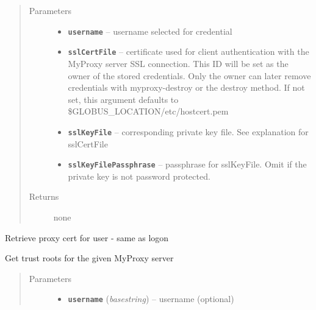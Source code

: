 \documentclass[letterpaper,10pt,english]{sphinxmanual}
\begin{document}
\begin{fulllineitems}
\begin{fulllineitems}
\begin{quote}
\begin{description}
\item[{Parameters}] \leavevmode\begin{itemize}
\item {} 
\textbf{\texttt{username}} -- username selected for credential

\item {} 
\textbf{\texttt{sslCertFile}} -- certificate used for client authentication with the MyProxy server SSL connection.  This ID will be set as the owner of the stored credentials.  Only the owner can later remove credentials with myproxy-destroy or the destroy method.  If not set, this argument defaults to \$GLOBUS\_LOCATION/etc/hostcert.pem

\item {} 
\textbf{\texttt{sslKeyFile}} -- corresponding private key file.  See explanation for sslCertFile

\item {} 
\textbf{\texttt{sslKeyFilePassphrase}} -- passphrase for sslKeyFile.  Omit if the private key is not password protected.

\end{itemize}

\item[{Returns}] \leavevmode
none

\end{description}\end{quote}

\end{fulllineitems}


\begin{fulllineitems}
\label{client:myproxy.client.MyProxyClient.getDelegation}
Retrieve proxy cert for user - same as logon

\end{fulllineitems}


\begin{fulllineitems}
\label{client:myproxy.client.MyProxyClient.getTrustRoots}
Get trust roots for the given MyProxy server
\begin{quote}\begin{description}
\item[{Parameters}] \leavevmode\begin{itemize}
\item {} 
\textbf{\texttt{username}} (\emph{basestring}) -- username (optional)


\end{itemize}
\end{description}
\end{quote}
\end{fulllineitems}
\end{fulllineitems}
\end{document}
